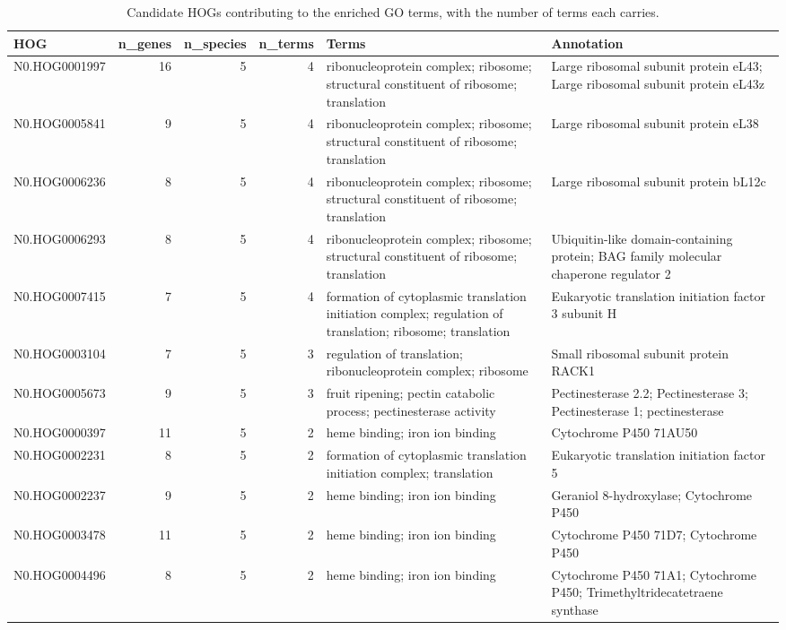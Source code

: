 \begin{table}

\caption{Candidate HOGs contributing to the enriched GO terms, with the number of terms each carries.}
\centering
\begin{tabular}[t]{lrrrll}
\toprule
HOG & n\_genes & n\_species & n\_terms & Terms & Annotation\\
\midrule
N0.HOG0001997 & 16 & 5 & 4 & ribonucleoprotein complex; ribosome; structural constituent of ribosome; translation & Large ribosomal subunit protein eL43; Large ribosomal subunit protein eL43z\\
N0.HOG0005841 & 9 & 5 & 4 & ribonucleoprotein complex; ribosome; structural constituent of ribosome; translation & Large ribosomal subunit protein eL38\\
N0.HOG0006236 & 8 & 5 & 4 & ribonucleoprotein complex; ribosome; structural constituent of ribosome; translation & Large ribosomal subunit protein bL12c\\
N0.HOG0006293 & 8 & 5 & 4 & ribonucleoprotein complex; ribosome; structural constituent of ribosome; translation & Ubiquitin-like domain-containing protein; BAG family molecular chaperone regulator 2\\
N0.HOG0007415 & 7 & 5 & 4 & formation of cytoplasmic translation initiation complex; regulation of translation; ribosome; translation & Eukaryotic translation initiation factor 3 subunit H\\
N0.HOG0003104 & 7 & 5 & 3 & regulation of translation; ribonucleoprotein complex; ribosome & Small ribosomal subunit protein RACK1\\
N0.HOG0005673 & 9 & 5 & 3 & fruit ripening; pectin catabolic process; pectinesterase activity & Pectinesterase 2.2; Pectinesterase 3; Pectinesterase 1; pectinesterase\\
N0.HOG0000397 & 11 & 5 & 2 & heme binding; iron ion binding & Cytochrome P450 71AU50\\
N0.HOG0002231 & 8 & 5 & 2 & formation of cytoplasmic translation initiation complex; translation & Eukaryotic translation initiation factor 5\\
N0.HOG0002237 & 9 & 5 & 2 & heme binding; iron ion binding & Geraniol 8-hydroxylase; Cytochrome P450\\
N0.HOG0003478 & 11 & 5 & 2 & heme binding; iron ion binding & Cytochrome P450 71D7; Cytochrome P450\\
N0.HOG0004496 & 8 & 5 & 2 & heme binding; iron ion binding & Cytochrome P450 71A1; Cytochrome P450; Trimethyltridecatetraene synthase\\

\end{tabular}
\end{table}
